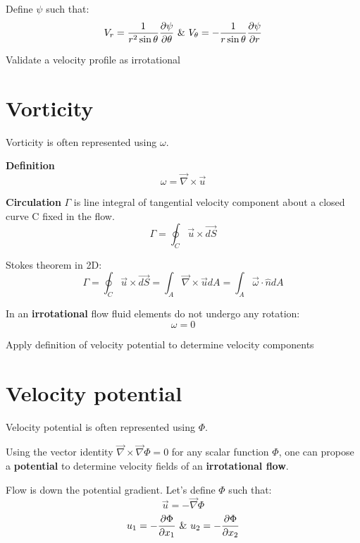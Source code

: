 Define $\psi$ such that:
 $$ V_r = {1 \over r^2 \sin\theta} {\partial \psi \over \partial \theta} \, \, \& \, \, V_\theta = - {1 \over r \sin\theta} {\partial \psi \over \partial r} $$



\begin {lo3} 
Validate a velocity profile as irrotational
\end {lo3}

\section{Vorticity}

Vorticity is often represented using $\omega$.

{\bf Definition}
$$ \omega = \vec{\nabla} \times \vec{u}$$

{\bf Circulation} $\Gamma$ is line integral of tangential velocity component about a closed curve C fixed in the flow.
$$ \Gamma = \oint_{C}{\vec{u} \times \vec{dS}}$$

Stokes theorem in 2D:
$$ \Gamma = \oint_{C}{\vec{u} \times \vec{dS}} = \int_{A}{\vec{\nabla} \times \vec{u} dA} =  \int_{A}{\vec{\omega} \cdot \hat{n} dA} $$ 

In an {\bf irrotational} flow fluid elements do not undergo any rotation:
$$ \omega = 0 $$ 


\begin {lo3} 
Apply definition of velocity potential to determine velocity components
\end {lo3}

\section{Velocity potential}

Velocity potential is often represented using $\Phi$.

Using the vector identity $\vec{\nabla} \times \vec{\nabla} \Phi = 0$ for any scalar function $\Phi$, one can propose a {\bf potential} to determine velocity fields of an {\bf irrotational flow}.

Flow is down the potential gradient. Let's define $\Phi$ such that:
$$ \vec{u} = -\vec{\nabla}\Phi $$
$$ u_1 = -{\partial \Phi \over \partial x_1} \, \, \& \, \, u_2 = -{\partial \Phi \over \partial x_2} $$


